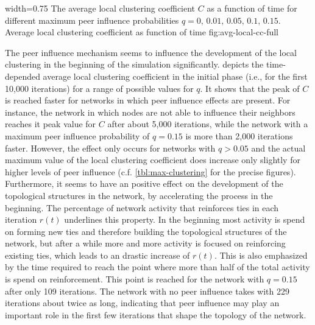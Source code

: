       {width=0.75\textwidth}
      {The average local clustering coefficient \( C \) as a function of time for different maximum peer influence probabilities \( q = 0, \, 0.01, \, 0.05, \, 0.1, \, 0.15\). }
      {Average local clustering coefficient as function of time}
      {fig:avg-local-cc-full}


The peer influence mechanism seems to influence the development of the local clustering in the beginning of the simulation significantly.
 depicts the time-depended average local clustering coefficient in the initial phase (i.e., for the first 10,000 iterations) for a range of possible values for \( q \).
It shows that the peak of \( C \) is reached faster for networks in which peer influence effects are present.
For instance, the network in which nodes are not able to influence their neighbors reaches it peak value for \( C \) after about 5,000 iterations, while the network with a maximum peer influence probability of \( q = 0.15 \) is more than 2,000 iterations faster.
However, the effect only occurs for networks with \( q > 0.05 \) and the actual maximum value of the local clustering coefficient does increase only slightly for higher levels of peer influence (c.f. \cref{tbl:max-clustering} for the precise figures).
Furthermore, it seems to have an positive effect on the development of the topological structures in the network, by accelerating the process in the beginning.
The percentage of network activity that reinforces ties in each iteration \( r(t) \) underlines this property.
In the beginning most activity is spend on forming new ties and therefore building the topological structures of the network, but after a while more and more activity is focused on reinforcing existing ties, which leads to an drastic increase of \( r(t) \).
This is also emphasized by the time required to reach the point where more than half of the total activity is spend on reinforcement.
This point is reached for the network with \( q = 0.15 \) after only 109 iterations.
The network with no peer influence takes with 229 iterations about twice as long, indicating that peer influence may play an important role in the first few iterations that shape the topology of the network.


